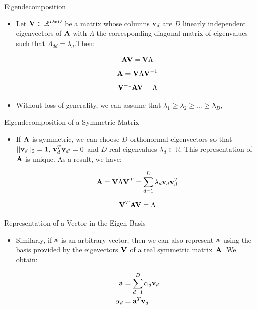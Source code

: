 \documentclass[serif,xcolor=pdftex,dvipsnames,table,hyperref={bookmarks=false,breaklinks}]{beamer}
\begin{document}
\begin{frame}[t]{Eigendecomposition}
 
\begin{itemize}

\item Let ${\mathbf{V}} \in \mathbb{R}^{DxD}$ be a matrix whose columns 
${\mathbf{v}}_d$ are $D$ linearly independent eigenvectors of ${\mathbf{A}}$ 
with $\Lambda$ the corresponding diagonal matrix of eigenvalues such that 
$\Lambda_{dd}=\lambda_d$.Then:

{\Large
$${\mathbf{A}}{\mathbf{V}} = {\mathbf{V}}\Lambda$$
\pause
$${\mathbf{A}} = {\mathbf{V}}\Lambda {\mathbf{V}}^{-1}$$
\pause
$${\mathbf{V}}^{-1}{\mathbf{A}}{\mathbf{V}} = \Lambda $$
}

\pause\item Without loss of generality, we can assume that $\lambda_1\geq 
\lambda_2\geq  ... \geq \lambda_D$,

\end{itemize} 
\end{frame}


\begin{frame}[t]{Eigendecomposition of a Symmetric Matrix}
 
\begin{itemize}

\item If ${\mathbf{A}}$ is symmetric, we can choose $D$ orthonormal eigenvectors so that
$||{\mathbf{v}}_d||_2=1$, ${\mathbf{v}}^T_d {\mathbf{v}}_{d'}=0$ and $D$ real eigenvalues 
$\lambda_d\in \mathbb{R}$. This representation of ${\mathbf{A}}$ is unique. 
As a result, we have:

{\Large
$${\mathbf{A}} = {\mathbf{V}}\Lambda {\mathbf{V}}^T = \sum_{d=1}^D \lambda_d {\mathbf{v}}_d{\mathbf{v}}^T_d$$

\pause
$${\mathbf{V}}^T{\mathbf{A}}{\mathbf{V}}=\Lambda$$ 
}

\end{itemize} 
\end{frame}

\begin{frame}[t]{Representation of a Vector in the Eigen Basis}
 
\begin{itemize}

\item Similarly, if ${\mathbf{a}}$ is an arbitrary vector, then we can also 
represent ${\mathbf{a}}$ using the basis provided by the eigevectors ${\mathbf{V}}$ of a 
real symmetric matrix ${\mathbf{A}}$. We obtain:

\Large
\begin{align}
{\mathbf{a}} &= \sum_{d=1}^D \alpha_d {\mathbf{v}}_d\\
\alpha_d&= {\mathbf{a}}^T{\mathbf{v}}_d
\end{align}

\end{itemize} 
\end{frame}
\end{document}
